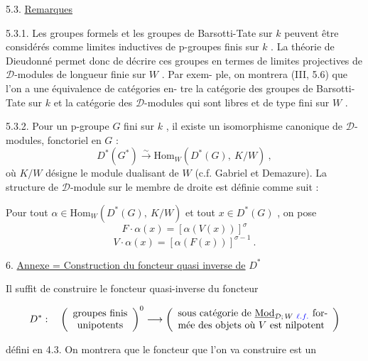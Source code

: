 \documentclass[11pt]{article}
\newcommand{\scanpage}[1]{\par\bigskip\noindent{\small\sffamily[scan #1]}\par}
\newcommand{\mspage}[1]{{\small\sffamily[p.\,#1]}}
\newcommand{\hand}[1]{\textcolor{blue}{#1}}
\newcommand{\uline}[1]{\underline{#1}}
\newenvironment{diagramblock}{\par\begin{center}}{\end{center}\par}
\begin{document}
5.3. \uline{Remarques}

5.3.1. Les groupes formels et les groupes de Barsotti-Tate sur $k$
peuvent être considérés comme limites inductives de p-groupes finis sur
$k$ . La théorie de Dieudonné permet donc de décrire ces groupes en termes
de limites projectives de $\mathcal{D}$-modules de longueur finie sur $W$ . Par exem-%
ple, on montrera (III, 5.6) que l'on a une équivalence de catégories en-%
tre la catégorie des groupes de Barsotti-Tate sur $k$ et la catégorie
des $\mathcal{D}$-modules qui sont libres et de type fini sur $W$ .

5.3.2. Pour un p-groupe $G$ fini sur $k$ , il existe un isomorphisme
canonique de $\mathcal{D}$-modules, fonctoriel en $G$ :
\[ D^*(G^*) \overset{\sim}{\to} \mathrm{Hom}_W(D^*(G),\ K/W) \ , \]
où $K/W$ désigne le module dualisant de $W$ (c.f. Gabriel et Demazure).
La structure de $\mathcal{D}$-module sur le membre de droite est définie comme suit :

Pour tout $\alpha \in \mathrm{Hom}_W(D^*(G),\ K/W)$ et tout $x \in D^*(G)$ , on pose
\[ F{\cdot}\alpha(x) = [\alpha(V(x))]^{\sigma} \]
\[ V{\cdot}\alpha(x) = [\alpha(F(x))]^{\sigma-1} \ . \]

6. \uline{Annexe = Construction du foncteur quasi inverse de} $D^*$

Il suffit de construire le foncteur quasi-inverse du foncteur
\begin{diagramblock}
\[ D^* : \quad \left(\begin{array}{c} \text{groupes finis} \\ \text{unipotents} \end{array}\right)^{0} \longrightarrow \left(\begin{array}{l} \text{sous catégorie de } \underline{\mathrm{Mod}}_{\mathcal{D};\,W\ \hand{\ell.f.}} \text{ for-} \\ \text{mée des objets où } V \text{ est nilpotent} \end{array}\right) \]
\end{diagramblock}
défini en 4.3. On montrera que le foncteur que l'on va construire est un

\mspage{\hand{49}}

\clearpage
\scanpage{129/50}
\mspage{\hand{II.22}}
\end{document}

